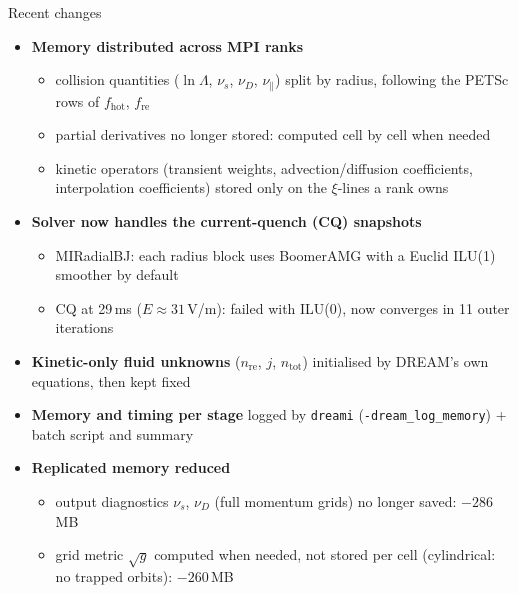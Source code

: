 
\begin{frame}{Recent changes}
    \begin{itemize}
        \item \textbf{Memory distributed across MPI ranks}
        \begin{itemize}
            \item collision quantities ($\ln\Lambda$, $\nu_s$, $\nu_D$, $\nu_\parallel$) split by radius,
                  following the PETSc rows of $f_\mathrm{hot}$, $f_\mathrm{re}$
            \item partial derivatives no longer stored: computed cell by cell when needed
            \item kinetic operators (transient weights, advection/diffusion coefficients,
                  interpolation coefficients) stored only on the $\xi$-lines a rank owns
        \end{itemize}
        \item \textbf{Solver now handles the current-quench (CQ) snapshots}
        \begin{itemize}
            \item MIRadialBJ: each radius block uses BoomerAMG with a
                  Euclid ILU(1) smoother by default
            \item CQ at 29\,ms ($E \approx 31$\,V/m): failed with ILU(0),
                  now converges in 11 outer iterations
        \end{itemize}
        \item \textbf{Kinetic-only fluid unknowns} ($n_\mathrm{re}$, $j$, $n_\mathrm{tot}$)
              initialised by DREAM's own equations, then kept fixed
        \item \textbf{Memory and timing per stage} logged by \texttt{dreami}
              (\texttt{-dream\_log\_memory}) + batch script and summary
        \item \textbf{Replicated memory reduced}
        \begin{itemize}
            \item output diagnostics $\nu_s$, $\nu_D$ (full momentum grids) no longer saved: $-286$\,MB
            \item grid metric $\sqrt{g}$ computed when needed, not stored per cell
                  (cylindrical: no trapped orbits): $-260$\,MB
        \end{itemize}
    \end{itemize}
\end{frame}

